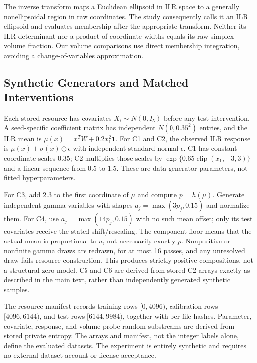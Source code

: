 \documentclass{article}
\newcommand{\clip}{\operatorname{clip}}
\begin{document}
The inverse transform maps a Euclidean ellipsoid in ILR space to a generally nonellipsoidal region in raw coordinates. The study consequently calls it an ILR ellipsoid and evaluates membership after the appropriate transform. Neither its ILR determinant nor a product of coordinate widths equals its raw-simplex volume fraction. Our volume comparisons use direct membership integration, avoiding a change-of-variables approximation.

\subsection{Synthetic Generators and Matched Interventions}\label{sec:generators}
Each stored resource has covariates $X_i\sim N(0,I_5)$ before any test intervention. A seed-specific coefficient matrix has independent $N(0,0.35^2)$ entries, and the ILR mean is $\mu(x)=x^TW+0.2x_1^2\mathbf1$. For C1 and C2, the observed ILR response is $\mu(x)+\sigma(x)\odot\epsilon$ with independent standard-normal $\epsilon$. C1 has constant coordinate scales $0.35$; C2 multiplies those scales by $\exp\{0.65\clip(x_1,-3,3)\}$ and a linear sequence from $0.5$ to $1.5$. These are data-generator parameters, not fitted hyperparameters.

For C3, add $2.3$ to the first coordinate of $\mu$ and compute $p=h(\mu)$. Generate independent gamma variables with shapes $a_j=\max(3p_j,0.15)$ and normalize them. For C4, use $a_j=\max(14p_j,0.15)$ with no such mean offset; only its test covariates receive the stated shift/rescaling. The component floor means that the actual mean is proportional to $a$, not necessarily exactly $p$. Nonpositive or nonfinite gamma draws are redrawn, for at most 16 passes, and any unresolved draw fails resource construction. This produces strictly positive compositions, not a structural-zero model. C5 and C6 are derived from stored C2 arrays exactly as described in the main text, rather than independently generated synthetic samples.

The resource manifest records training rows $[0,4096)$, calibration rows $[4096,6144)$, and test rows $[6144,9984)$, together with per-file hashes. Parameter, covariate, response, and volume-probe random substreams are derived from stored private entropy. The arrays and manifest, not the integer labels alone, define the evaluated datasets. The experiment is entirely synthetic and requires no external dataset account or license acceptance.
\end{document}
